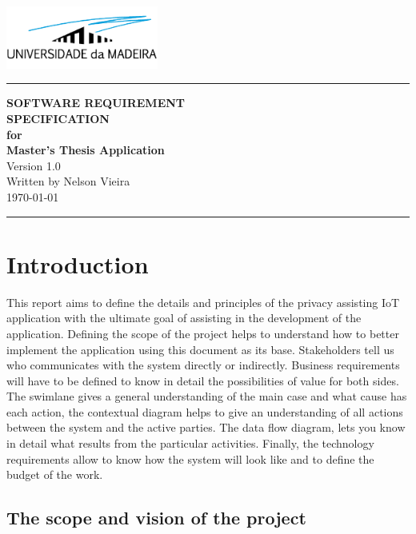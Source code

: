 \documentclass{scrreprt}
\date{May 31, 2023}
\begin{document}
\begin{flushright}
    \includegraphics[width=5cm]{assets/images/uma_logo.png}
    \rule{16cm}{5pt}\vskip1cm
    \Huge{\textbf{\uppercase{Software Requirement}} \\ \textbf{\uppercase{Specification}}} \\
    \vspace{1cm}
    \textbf{for} \\
    \vspace{1cm}
    \textbf{Master's Thesis Application} \\
    \vspace{2cm}
    \LARGE{Version 1.0 \\}
    \vspace{2cm}
    Written by Nelson Vieira \\
    \vspace{2cm}
    \today
    \vfill
    \rule{16cm}{5pt}
\end{flushright}

\tableofcontents

\chapter{Introduction}

This report aims to define the details and principles of the privacy assisting
IoT application with the ultimate goal of assisting in the development
of the application. Defining the scope of the project helps to understand
how to better implement the application using this document as its base.
Stakeholders tell us who communicates
with the system directly or indirectly. Business requirements will have
to be defined to know in detail the possibilities of value for both sides.
The swimlane gives a general understanding of the main case and what cause
has each action, the contextual diagram helps to give an understanding
of all actions between the system and the active parties. The data flow
diagram, lets you know in detail what results from the particular activities.
Finally, the technology requirements allow to know how the system will
look like and to define the budget of the work.

\section{The scope and vision of the project}
\end{document}
